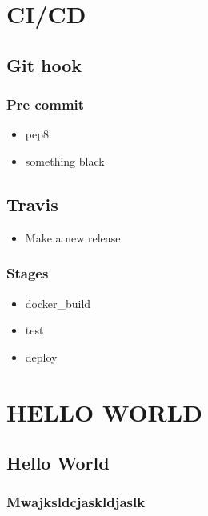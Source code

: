 \hypertarget{cicd}{%
\section{CI/CD}\label{cicd}}

\hypertarget{git-hook}{%
\subsection{Git hook}\label{git-hook}}

\hypertarget{pre-commit}{%
\subsubsection{Pre commit}\label{pre-commit}}

\begin{itemize}
\tightlist
\item
  pep8
\item
  something black
\end{itemize}

\hypertarget{travis}{%
\subsection{Travis}\label{travis}}

\begin{itemize}
\tightlist
\item
  Make a new release
\end{itemize}

\hypertarget{stages}{%
\subsubsection{Stages}\label{stages}}

\begin{itemize}
\tightlist
\item
  docker\_build
\item
  test
\item
  deploy
\end{itemize}

\hypertarget{hello-world}{%
\section{HELLO WORLD}\label{hello-world}}

\hypertarget{hello-world-1}{%
\subsection{Hello World}\label{hello-world-1}}

\hypertarget{mwajksldcjaskldjaslk}{%
\subsubsection{Mwajksldcjaskldjaslk}\label{mwajksldcjaskldjaslk}}
